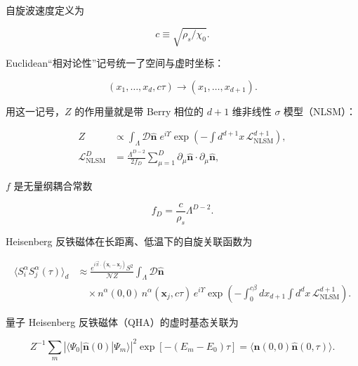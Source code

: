 自旋波速度定义为

\begin{equation*}
c \equiv \sqrt {\rho_ {s} / \chi_ {0}}.
\tag{12.33}
\end{equation*}

Euclidean“相对论性”记号统一了空间与虚时坐标：

\begin{equation*}
\left( x _ {1}, \dots , x _ {d}, c \tau \right) \rightarrow \left( x _ {1}, \dots , x _ {d + 1} \right).
\tag{12.34}
\end{equation*}

用这一记号，$Z$ 的作用量就是带 Berry 相位的 $d + 1$ 维非线性 {$\sigma$} 模型（NLSM）：

\begin{align*}
Z & \propto \int_{\Lambda} \mathcal {D} \hat {\mathbf {n}} \; e ^ {i \Upsilon} \exp \left( - \int d ^ {d + 1} x \, \mathcal {L}_{\mathrm{NLSM}} ^ {d + 1} \right) ,\\
\mathcal {L}_{\mathrm{NLSM}} ^ {D} & = \frac {\Lambda^ {D - 2}}{2 f _ {D}} \sum_ {\mu = 1} ^ {D} \partial_ {\mu} \hat {\mathbf {n}} \cdot \partial_ {\mu} \hat {\mathbf {n}} ,
\tag{12.35}
\end{align*}

$f$ 是无量纲耦合常数

\begin{equation*}
f _ {D} = \frac {c}{\rho_ {s}} \Lambda^ {D - 2}.
\tag{12.36}
\end{equation*}

Heisenberg 反铁磁体在长距离、低温下的自旋关联函数为

\begin{align*}
\langle S _ {i} ^ {\alpha} S _ {j} ^ {\alpha} ( \tau ) \rangle_ {d} & \approx \frac {e ^ {i \vec {\pi} \cdot ( \mathbf {x} _ {i} - \mathbf {x} _ {j} )} S ^ {2}}{\mathcal {N} Z} \int_{\Lambda} \mathcal {D} \hat {\mathbf {n}}\\
& \quad \times n ^ {\alpha} ( 0, 0 ) \, n ^ {\alpha} ( \mathbf {x} _ {j}, c \tau ) \, e ^ {i \Upsilon} \exp \left( - \int_ {0} ^ {c \beta} d x _ {d + 1} \int d ^ {d} x \, \mathcal {L}_{\mathrm{NLSM}} ^ {d + 1} \right) .
\tag{12.37}
\end{align*}

量子 Heisenberg 反铁磁体（QHA）的虚时基态关联为

\begin{equation*}
Z ^ {- 1} \sum_ {m} \left| \langle \Psi_ {0} | \hat {\mathbf {n}} ( 0 ) | \Psi_ {m} \rangle \right| ^ {2} \exp [ - ( E _ {m} - E _ {0} ) \tau ] = \langle \hat {\mathbf {n}} ( 0, 0 ) \hat {\mathbf {n}} ( 0, \tau ) \rangle .
\tag{12.38}
\end{equation*}

